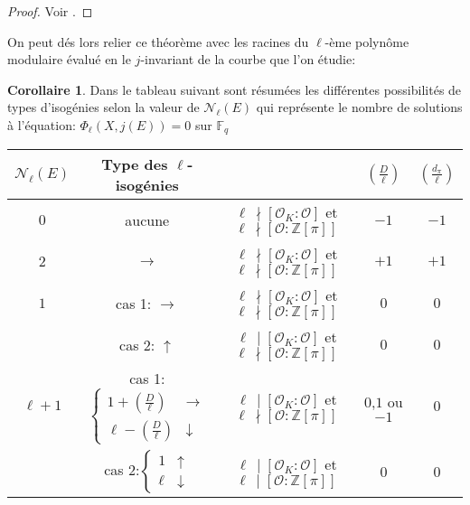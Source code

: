 \documentclass[10pt,a4paper]{book}
\theoremstyle{plain}
\theoremstyle{definition}
\theoremstyle{definition}
\newtheorem{cor}[thm]{Corollaire}
\theoremstyle{definition}
\theoremstyle{definition}
\theoremstyle{remark}
\theoremstyle{remark}
\theoremstyle{definition}
\begin{document}
\begin{proof}
Voir \cite[Proposition 23]{Kohel96}.
\end{proof}

On peut dés lors relier ce théorème avec les racines du $\ell$-ème polynôme modulaire évalué en le $j$-invariant de la courbe que l'on étudie:

\begin{cor}
\label{cor:tab:vol} 
Dans le tableau suivant sont résumées les différentes possibilités de types d'isogénies selon la valeur de $\mathcal{N}_{\ell}(E)$ qui représente le nombre de solutions à l'équation: $\Phi_{\ell}(X,j(E))=0$ sur $\mathbb{F}_q$
\newline
\begin{tabular}{|c|c|c|c|c|}
\hline 
$\mathcal{N}_{\ell}(E)$ & Type des $\ell$-isogénies &  & $\left(\frac{D}{\ell}\right)$ & $\left(\frac{d_{\pi}}{\ell}\right)$\tabularnewline
\hline 
\hline 
$0$ & aucune & $\ell \,\nmid[\mathcal{O}_{K}:\mathcal{O}]$ et $\ell \,\nmid[\mathcal{O}:\mathbb{Z}[\pi]]$  & $-1$ & $-1$\\
\hline 
$2$ & $\rightarrow$ & $\ell \,\nmid[\mathcal{O}_{K}:\mathcal{O}]$ et $\ell \,\nmid[\mathcal{O}:\mathbb{Z}[\pi]]$  & $+1$ & $+1$\\
\hline 
$1$ & cas 1: $\rightarrow$ & $\ell\,\nmid[\mathcal{O}_{K}:\mathcal{O}]$ et $\ell\,\nmid[\mathcal{O}:\mathbb{Z}[\pi]]$  & $0$ & $0$\\

\cline{2-5} & cas 2: $\uparrow$ & $\ell\,\mid[\mathcal{O}_{K}:\mathcal{O}]$ et $\ell\,\nmid[\mathcal{O}:\mathbb{Z}[\pi]]$  & $0$ & $0$\\
\hline 
$\ell+1$ & cas 1:$\left\{ \begin{array}{cc}
1+\left(\frac{D}{\ell}\right) & \rightarrow\\
\ell-\left(\frac{D}{\ell}\right) & \downarrow
\end{array}\right.$ & $\ell \,\mid[\mathcal{O}_{K}:\mathcal{O}]$ et $\ell \,\nmid[\mathcal{O}:\mathbb{Z}[\pi]]$  & $0$,$1$ ou $-1$ & $0$\\
 
\cline{2-5} & cas 2:$\left\{ \begin{array}{cc}
1 & \uparrow\\
\ell & \downarrow
\end{array}\right.$ & $\ell \,\mid[\mathcal{O}_{K}:\mathcal{O}]$ et $\ell \,\mid[\mathcal{O}:\mathbb{Z}[\pi]]$  & $0$ & $0$ \\
\hline 
\end{tabular}
\end{cor}
\end{document}
